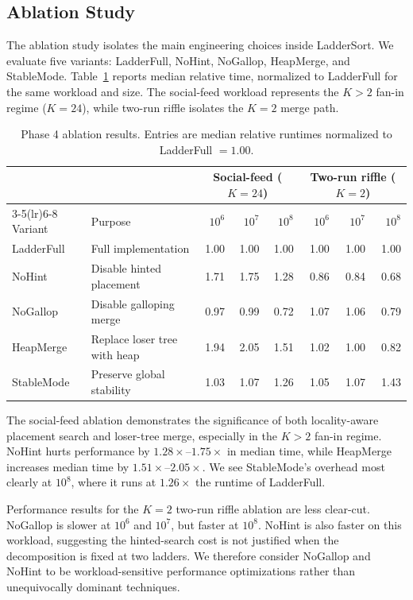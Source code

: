 \documentclass[10pt]{article}
\begin{document}
\subsection{Ablation Study}
\label{ablation-study}

The ablation study isolates the main engineering choices inside LadderSort.
We evaluate five variants: LadderFull, NoHint, NoGallop, HeapMerge, and
StableMode. Table~\ref{tab:phase4-ablation} reports median relative time,
normalized to LadderFull for the same workload and size. The social-feed
workload represents the \(K>2\) fan-in regime (\(K=24\)), while two-run
riffle isolates the \(K=2\) merge path.

\begin{table}[H]
\centering
\small
\caption{Phase 4 ablation results. Entries are median relative runtimes normalized to LadderFull \(=1.00\).}
\label{tab:phase4-ablation}
\begin{tabularx}{\linewidth}{@{}l X rrr rrr@{}}
\toprule
& & \multicolumn{3}{c}{Social-feed (\(K=24\))} & \multicolumn{3}{c}{Two-run riffle (\(K=2\))} \\
\cmidrule(lr){3-5}\cmidrule(lr){6-8}
Variant & Purpose & \(10^6\) & \(10^7\) & \(10^8\) & \(10^6\) & \(10^7\) & \(10^8\) \\
\midrule
LadderFull & Full implementation & 1.00 & 1.00 & 1.00 & 1.00 & 1.00 & 1.00 \\
NoHint & Disable hinted placement & 1.71 & 1.75 & 1.28 & 0.86 & 0.84 & 0.68 \\
NoGallop & Disable galloping merge & 0.97 & 0.99 & 0.72 & 1.07 & 1.06 & 0.79 \\
HeapMerge & Replace loser tree with heap & 1.94 & 2.05 & 1.51 & 1.02 & 1.00 & 0.82 \\
StableMode & Preserve global stability & 1.03 & 1.07 & 1.26 & 1.05 & 1.07 & 1.43 \\
\bottomrule
\end{tabularx}
\end{table}

The social-feed ablation demonstrates the significance of both locality-aware
placement search and loser-tree merge, especially in the \(K>2\) fan-in regime.
NoHint hurts performance by \(1.28\times\)--\(1.75\times\) in median time,
while HeapMerge increases median time by \(1.51\times\)--\(2.05\times\). We see
StableMode's overhead most clearly at \(10^8\), where it runs at
\(1.26\times\) the runtime of LadderFull.

Performance results for the \(K=2\) two-run riffle ablation are less clear-cut.
NoGallop is slower at \(10^6\) and \(10^7\), but faster at \(10^8\). NoHint is
also faster on this workload, suggesting the hinted-search cost is not
justified when the decomposition is fixed at two ladders. We therefore consider
NoGallop and NoHint to be workload-sensitive performance optimizations rather
than unequivocally dominant techniques.
\end{document}
